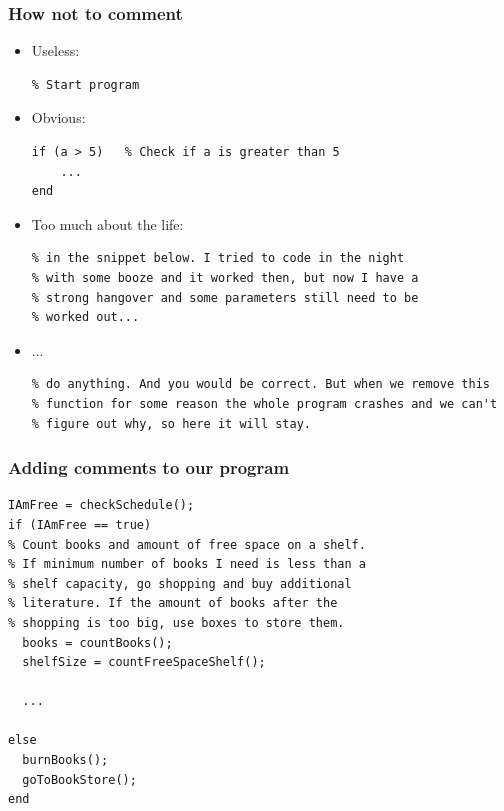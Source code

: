 \documentclass[11pt,table,final,fleqn,xcolor={usenames,dvipsnames},unknownkeysallowed,handout]{beamer}
\begin{document}
\begin{frame}[fragile]
 \frametitle{How not to comment}
 \begin{itemize}[<+->]
  \item Useless:
  \begin{lstlisting}
% Start program 
  \end{lstlisting}
  \item Obvious:
  \begin{lstlisting}
if (a > 5)   % Check if a is greater than 5
    ... 
end\end{lstlisting}
  \item Too much about the life:
  \begin{lstlisting}[basicstyle=\tiny\ttfamily]
% Well... I do not know how to explain what is going on
% in the snippet below. I tried to code in the night 
% with some booze and it worked then, but now I have a 
% strong hangover and some parameters still need to be
% worked out...
  \end{lstlisting}

  \item ...
  \begin{lstlisting}[basicstyle=\tiny\ttfamily]
% You may think that this function is obsolete, and doesn't seem to
% do anything. And you would be correct. But when we remove this 
% function for some reason the whole program crashes and we can't 
% figure out why, so here it will stay.
  \end{lstlisting}
 \end{itemize}
\end{frame}

\begin{frame}[fragile]
 \frametitle{Adding comments to our program}
 \begin{lstlisting}
IAmFree = checkSchedule();
if (IAmFree == true)
% Count books and amount of free space on a shelf. 
% If minimum number of books I need is less than a 
% shelf capacity, go shopping and buy additional 
% literature. If the amount of books after the 
% shopping is too big, use boxes to store them.
  books = countBooks();
  shelfSize = countFreeSpaceShelf();
  
  ...

else
  burnBooks();
  goToBookStore();
end
 \end{lstlisting}
\end{frame}

\end{document}
